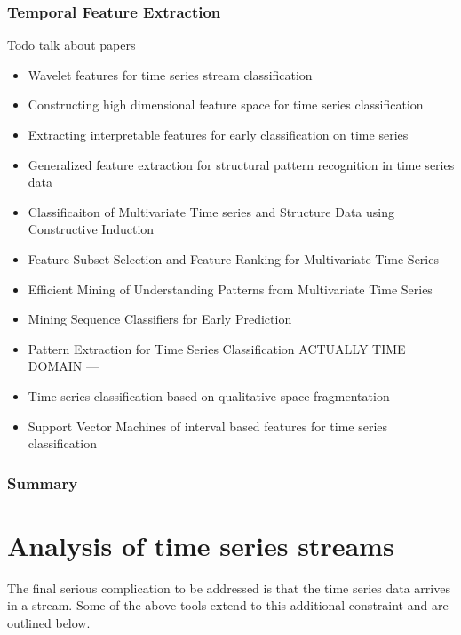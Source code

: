 \documentclass[11pt]{article}
\begin{document}
	\subsubsection{Temporal Feature Extraction}
	Todo talk about papers
	\begin{itemize}
	\item Wavelet features for time series stream classification \citep{xing2011extracting}
	\item Constructing high dimensional feature space for time series classification \citep{eruhimov2007constructing}
	\item Extracting interpretable features for early classification on time series \citep{xing2011extracting}
	\item Generalized feature extraction for structural pattern recognition in time series data \citep{olszewski2001generalized}
	\item Classificaiton of Multivariate Time series and Structure Data using Constructive Induction \citep{kadous2005classification}
	\item Feature Subset Selection and Feature Ranking for Multivariate Time Series \citep{yoon2005feature}
	\item Efficient Mining of Understanding Patterns from Multivariate Time Series \citep{morchen2007efficient}
	\item Mining Sequence Classifiers for Early Prediction \citep{xing2008mining}
	\item Pattern Extraction for Time Series Classification ACTUALLY TIME DOMAIN --- \citep{geurts2001pattern}
	\item Time series classification based on qualitative space fragmentation \citep{jagnjic2009time}
	\item Support Vector Machines of interval based features for time series classification \citep{rodriguez2005support}
	\end{itemize}
	
	\subsubsection{Summary}

	\section{Analysis of time series streams}
	The final serious complication to be addressed is that the time series data arrives in a stream. Some of the above tools extend to this additional constraint and are outlined below.
\end{document}
